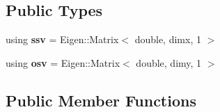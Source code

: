 \subsection*{Public Types}
\begin{DoxyCompactItemize}
\item 
using {\bfseries ssv} = Eigen\+::\+Matrix$<$ double, dimx, 1 $>$\hypertarget{classsvol__apf_a67f877a96c5c9db4ee642055af035247}{}\label{classsvol__apf_a67f877a96c5c9db4ee642055af035247}

\item 
using {\bfseries osv} = Eigen\+::\+Matrix$<$ double, dimy, 1 $>$\hypertarget{classsvol__apf_a78110f077d21b8e463c7cdea66354bc3}{}\label{classsvol__apf_a78110f077d21b8e463c7cdea66354bc3}

\end{DoxyCompactItemize}
\subsection*{Public Member Functions}
